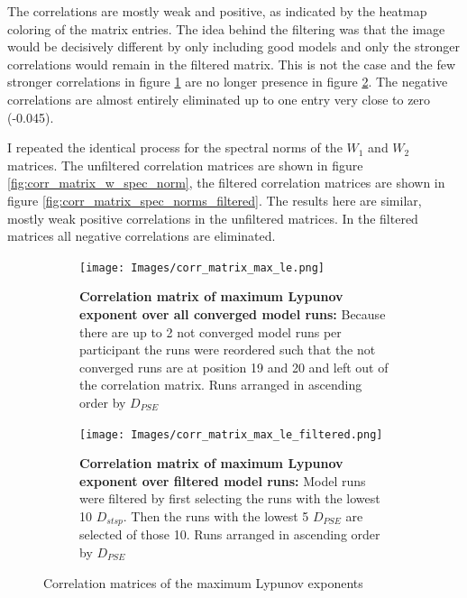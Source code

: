 The correlations are mostly weak and positive, as indicated by the heatmap coloring of the matrix entries. The idea behind the filtering was that the image would be decisively 
different by only including good models and only the stronger correlations would remain in the filtered matrix. This is not the case and the few stronger correlations in 
figure \ref{fig:corr_matrix_max_le} are no longer presence in figure \ref{fig:corr_matrix_max_le_filtered}. The negative correlations are almost entirely eliminated up to 
one entry very close to zero (-0.045).

I repeated the identical process for the spectral norms of the $W_1$ and $W_2$ matrices. The unfiltered correlation matrices are shown in figure \ref{fig:corr_matrix_w_spec_norm},
the filtered correlation matrices are shown in figure \ref{fig:corr_matrix_spec_norms_filtered}. The results here are similar, mostly weak positive correlations in the unfiltered
matrices. In the filtered matrices all negative correlations are eliminated.

\begin{figure}
    \begin{subfigure}[t]{0.48\textwidth}
        \centering
        \texttt{[image: Images/corr\_matrix\_max\_le.png]}
        \caption[Correlation matrix of maximum Lypunov exponent over all converged runs]
        {\textbf{Correlation matrix of maximum Lypunov exponent over all converged model runs: } Because there are up to 2 not converged model runs per participant the runs were 
        reordered such that the not converged runs are at position 19 and 20 and left out of the correlation matrix. Runs arranged in ascending order by $D_{PSE}$}
        \label{fig:corr_matrix_max_le}
    \end{subfigure}
    \begin{subfigure}[t]{0.48\textwidth}
        \centering
        \texttt{[image: Images/corr\_matrix\_max\_le\_filtered.png]}
        \caption[Correlation matrix of maximum Lypunov exponent over filtered model runs]
        {\textbf{Correlation matrix of maximum Lypunov exponent over filtered model runs: } Model runs were filtered by first selecting the runs with the lowest 10 $D_{stsp}$.
        Then the runs with the lowest 5 $D_{PSE}$ are selected of those 10. Runs arranged in ascending order by $D_{PSE}$}
        \label{fig:corr_matrix_max_le_filtered}
    \end{subfigure}
    \caption[Correlation matrices of the maximum Lypunov exponents]{Correlation matrices of the maximum Lypunov exponents}
    \label{fig:max_le_cor_matrices}
\end{figure}

